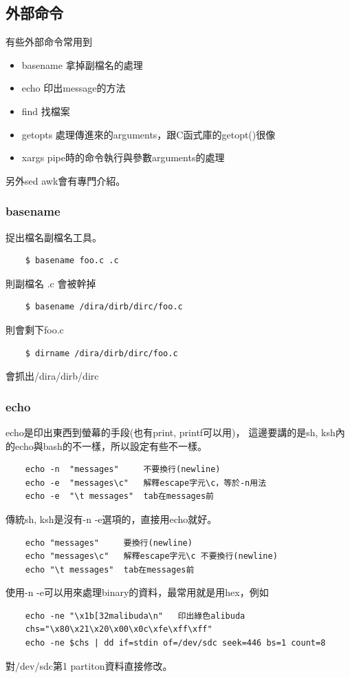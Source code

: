     \subsection{外部命令}
    有些外部命令常用到
    \begin{itemize}
    \item basename 拿掉副檔名的處理
    \item echo 印出message的方法
    \item find 找檔案
    \item getopts 處理傳進來的arguments，跟C函式庫的getopt()很像
    \item xargs pipe時的命令執行與參數arguments的處理
    \end{itemize}
    另外sed awk會有專門介紹。
    \subsubsection{basename}
    捉出檔名副檔名工具。
    \begin{verbatim}
    $ basename foo.c .c
    \end{verbatim}
    則副檔名 .c 會被幹掉
    \begin{verbatim}
    $ basename /dira/dirb/dirc/foo.c
    \end{verbatim}
    則會剩下foo.c
    \begin{verbatim}
    $ dirname /dira/dirb/dirc/foo.c
    \end{verbatim}
    會抓出/dira/dirb/dirc
    \subsubsection{echo}
    echo是印出東西到螢幕的手段(也有print, printf可以用)，
    這邊要講的是sh, ksh內的echo與bash的不一樣，所以設定有些不一樣。
    \begin{verbatim}
    echo -n  "messages"     不要換行(newline)
    echo -e  "messages\c"   解釋escape字元\c，等於-n用法
    echo -e  "\t messages"  tab在messages前
    \end{verbatim}
    傳統sh, ksh是沒有-n -e選項的，直接用echo就好。
    \begin{verbatim}
    echo "messages"     要換行(newline)
    echo "messages\c"   解釋escape字元\c 不要換行(newline)
    echo "\t messages"  tab在messages前
    \end{verbatim}
    使用-n -e可以用來處理binary的資料，最常用就是用hex，例如
    \begin{verbatim}
    echo -ne "\x1b[32malibuda\n"   印出綠色alibuda
    chs="\x80\x21\x20\x00\x0c\xfe\xff\xff"
    echo -ne $chs | dd if=stdin of=/dev/sdc seek=446 bs=1 count=8
    \end{verbatim}
    對/dev/sdc第1 partiton資料直接修改。
